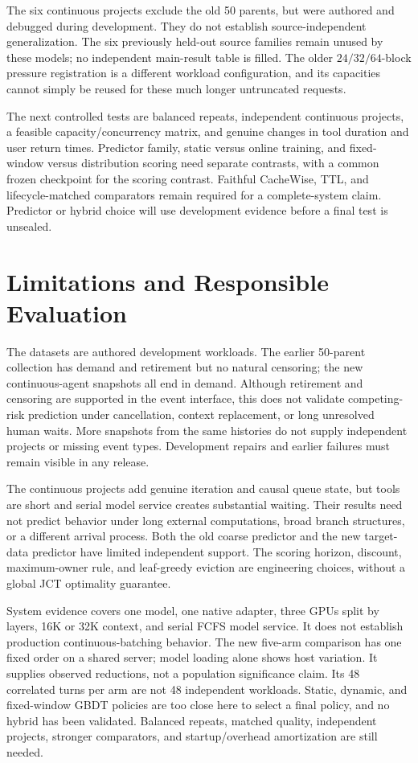 \documentclass[sigconf, screen, review]{acmart}
\begin{document}
The six continuous projects exclude the old 50 parents, but were authored
and debugged during development. They do not establish source-independent
generalization. The six previously held-out source families remain
unused by these models; no independent main-result table is filled.
The older \(24/32/64\)-block pressure registration is a different
workload configuration, and its capacities cannot simply be reused for
these much longer untruncated requests.

The next controlled tests are balanced repeats, independent continuous
projects, a feasible capacity/concurrency matrix, and genuine changes
in tool duration and user return times. Predictor family, static versus
online training, and fixed-window versus distribution scoring need
separate contrasts, with a common frozen checkpoint for the scoring
contrast. Faithful CacheWise, TTL, and lifecycle-matched comparators
remain required for a complete-system claim. Predictor or hybrid choice
will use development evidence before a final test is unsealed.

\section{Limitations and Responsible Evaluation}
\label{limitations-and-responsible-evaluation}

The datasets are authored development workloads. The earlier 50-parent
collection has demand and retirement but no natural censoring; the new
continuous-agent snapshots all end in demand. Although retirement and
censoring are supported in the event interface, this does not validate
competing-risk prediction under cancellation, context replacement, or
long unresolved human waits. More snapshots from the same histories do
not supply independent projects or missing event types. Development
repairs and earlier failures must remain visible in any release.

The continuous projects add genuine iteration and causal queue state,
but tools are short and serial model service creates substantial
waiting. Their results need not predict behavior under long external
computations, broad branch structures, or a different arrival process.
Both the old coarse predictor and the new target-data predictor have
limited independent support. The scoring horizon, discount,
maximum-owner rule, and leaf-greedy eviction are engineering choices,
without a global JCT optimality guarantee.

System evidence covers one model, one native adapter, three GPUs split
by layers, 16K or 32K context, and serial FCFS model service. It does not
establish production continuous-batching behavior. The new five-arm
comparison has one fixed order on a shared server; model loading alone
shows host variation. It supplies observed reductions, not a population
significance claim. Its 48 correlated turns per arm are not 48
independent workloads. Static, dynamic, and fixed-window GBDT policies
are too close here to select a final policy, and no hybrid has been
validated. Balanced repeats, matched quality, independent projects,
stronger comparators, and startup/overhead amortization are still needed.
\end{document}
